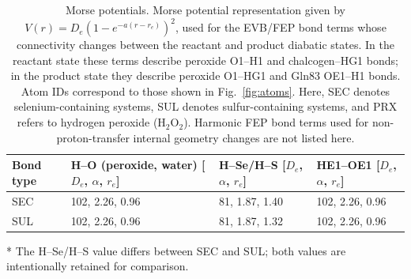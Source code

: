\documentclass[journal=jpcbfk,manuscript=suppinfo]{achemso}
\begin{document}
\begin{table}[H]
\centering
\caption[Morse potentials]{Morse potentials. {\normalfont
Morse potential representation given by $V(r) = D_e\left(1 - e^{-a(r-r_e)}\right)^2$,
used for the EVB/FEP bond terms whose connectivity changes between the reactant and product diabatic states. In the reactant state these terms describe peroxide O1--H1 and chalcogen--HG1 bonds; in the product state they describe peroxide O1--HG1 and Gln83 OE1--H1 bonds. Atom IDs correspond to those shown in Fig.~\ref{fig:atoms}.
Here, SEC denotes selenium-containing systems, SUL denotes sulfur-containing systems,
and PRX refers to hydrogen peroxide ($\mathrm{H_2O_2}$). Harmonic FEP bond terms used for non-proton-transfer internal geometry changes are not listed here.}}
\begin{threeparttable}
\begin{tabularx}{\textwidth}{lXXX}
\toprule
\textbf{Bond type} &
\makecell{\textbf{H--O (peroxide,} \\ \textbf{water) [$D_e$, $\alpha$, $r_e$]}} &
\makecell{\textbf{H--Se/H--S} \\ \textbf{[$D_e$, $\alpha$, $r_e$]}} &
\makecell{\textbf{HE1--OE1} \\ \textbf{[$D_e$, $\alpha$, $r_e$]}} \\
\midrule
SEC & 102, 2.26, 0.96 & 81, 1.87, 1.40\tnote{*} & 102, 2.26, 0.96 \\
SUL & 102, 2.26, 0.96 & 81, 1.87, 1.32\tnote{*} & 102, 2.26, 0.96 \\
\bottomrule
\end{tabularx}
\begin{tablenotes}
\item[*] The H--Se/H--S value differs between SEC and SUL; both values are intentionally retained for comparison.
\end{tablenotes}
\end{threeparttable}
\label{tab:morse}
\end{table}
    
\end{document}
